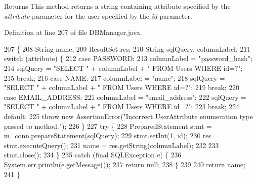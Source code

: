 \begin{DoxyReturn}{Returns}
This method returns a string containing attribute specified by the {\itshape attribute} parameter for the user specified by the {\itshape id} parameter. 
\end{DoxyReturn}


Definition at line 207 of file D\+B\+Manager.\+java.


\begin{DoxyCode}
207                                                                                       \{
208         String name;
209         ResultSet res;
210         String sqlQuery, columnLabel;
211         \textcolor{keywordflow}{switch} (attribute) \{
212             \textcolor{keywordflow}{case} PASSWORD:
213                 columnLabel = \textcolor{stringliteral}{"password\_hash"};
214                 sqlQuery = \textcolor{stringliteral}{"SELECT "} + columnLabel + \textcolor{stringliteral}{" FROM Users WHERE id=?"};
215                 \textcolor{keywordflow}{break};
216             \textcolor{keywordflow}{case} NAME:
217                 columnLabel = \textcolor{stringliteral}{"name"};
218                 sqlQuery = \textcolor{stringliteral}{"SELECT "} + columnLabel + \textcolor{stringliteral}{" FROM Users WHERE id=?"};
219                 \textcolor{keywordflow}{break};
220             \textcolor{keywordflow}{case} EMAIL\_ADDRESS:
221                 columnLabel = \textcolor{stringliteral}{"email\_address"};
222                 sqlQuery = \textcolor{stringliteral}{"SELECT "} + columnLabel + \textcolor{stringliteral}{" FROM Users WHERE id=?"};
223                 \textcolor{keywordflow}{break};
224             \textcolor{keywordflow}{default}:
225                 \textcolor{keywordflow}{throw} \textcolor{keyword}{new} AssertionError(\textcolor{stringliteral}{"Incorrect UserAttribute enumeration type passed to method."});
226         \}
227         \textcolor{keywordflow}{try} \{
228             PreparedStatement stmt = \mbox{\hyperlink{classcom_1_1activitytracker_1_1_d_b_manager_a064088d13ac09eb147fdc19268771521}{m\_conn}}.prepareStatement(sqlQuery);
229             stmt.setInt(1, \textcolor{keywordtype}{id});
230             res = stmt.executeQuery();
231             name = res.getString(columnLabel);
232 
233             stmt.close();
234         \}
235         \textcolor{keywordflow}{catch} (\textcolor{keyword}{final} SQLException e) \{
236             System.err.println(e.getMessage());
237             \textcolor{keywordflow}{return} null;
238         \}
239 
240         \textcolor{keywordflow}{return} name;
241     \}
\end{DoxyCode}
\mbox{\label{classcom_1_1activitytracker_1_1_d_b_manager_a41df4600bb5901a26a4ea6a7108a70b9}} 

